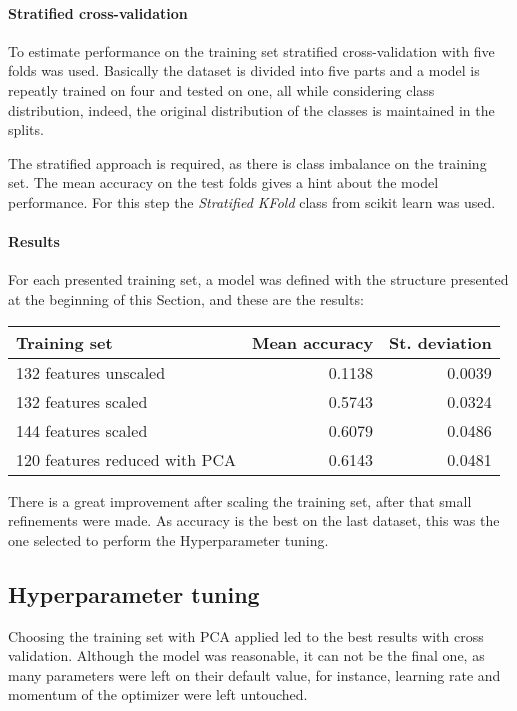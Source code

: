 \paragraph{Stratified cross-validation}
To estimate performance on the training set stratified cross-validation with 
five folds was used. Basically the dataset is divided into five parts 
and a model is repeatly trained on four and tested on one, all while considering class 
distribution, indeed, the original distribution of the classes is maintained 
in the splits.~\cite{stratified}

The stratified approach is required, as there is class imbalance on the training set. 
The mean accuracy on the test folds gives a hint about the model performance.
For this step the \emph{Stratified KFold} class from scikit learn was used.~\cite{cross-scikit}

\paragraph{Results}
For each presented training set, a model was defined 
with the structure presented at the beginning of this Section, 
and these are the results:

\begin{center}
    \begin{tabular}{ |l|r|r| } 
        \hline
        Training set & Mean accuracy & St. deviation \\
        \hline
        132 features unscaled &  0.1138 & 0.0039 \\
        132 features scaled &  0.5743 & 0.0324 \\
        144 features scaled &  0.6079 & 0.0486 \\
        120 features reduced with PCA &  0.6143 & 0.0481 \\
        \hline
    \end{tabular}
\end{center}

There is a great improvement after scaling the training set, after 
that small refinements were made.
As accuracy is the best on the last dataset, this was the one selected to 
perform the Hyperparameter tuning.

\subsection{Hyperparameter tuning}

Choosing the training set with PCA applied led to the best results 
with cross validation. Although the model was reasonable, it can not be the 
final one, as many parameters were left on their default value, for instance, 
learning rate and momentum of the optimizer were left untouched. 

